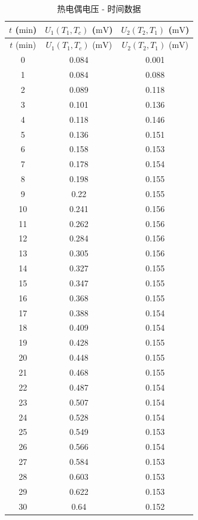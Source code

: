 \documentclass{customDoc}
\begin{document}
\begin{longtable}{|c|c|c|}
    \caption{热电偶电压 - 时间数据} \\
    \hline
    $t$ ($\si{\minute}$) & $U_1(T_1, T_c)$ ($\si{\milli\volt}$) & $U_2 (T_2, T_1)$ ($\si{\milli\volt}$) \\
    \hline
    \endfirsthead
    \hline
    $t$ ($\si{\minute}$) & $U_1(T_1, T_c)$ ($\si{\milli\volt}$) & $U_2 (T_2, T_1)$ ($\si{\milli\volt}$) \\
    \hline
    \endhead
    0     & 0.084 & 0.001 \\
    \hline
    1     & 0.084 & 0.088 \\
    \hline
    2     & 0.089 & 0.118 \\
    \hline
    3     & 0.101 & 0.136 \\
    \hline
    4     & 0.118 & 0.146 \\
    \hline
    5     & 0.136 & 0.151 \\
    \hline
    6     & 0.158 & 0.153 \\
    \hline
    7     & 0.178 & 0.154 \\
    \hline
    8     & 0.198 & 0.155 \\
    \hline
    9     & 0.22  & 0.155 \\
    \hline
    10    & 0.241 & 0.156 \\
    \hline
    11    & 0.262 & 0.156 \\
    \hline
    12    & 0.284 & 0.156 \\
    \hline
    13    & 0.305 & 0.156 \\
    \hline
    14    & 0.327 & 0.155 \\
    \hline
    15    & 0.347 & 0.155 \\
    \hline
    16    & 0.368 & 0.155 \\
    \hline
    17    & 0.388 & 0.154 \\
    \hline
    18    & 0.409 & 0.154 \\
    \hline
    19    & 0.428 & 0.155 \\
    \hline
    20    & 0.448 & 0.155 \\
    \hline
    21    & 0.468 & 0.155 \\
    \hline
    22    & 0.487 & 0.154 \\
    \hline
    23    & 0.507 & 0.154 \\
    \hline
    24    & 0.528 & 0.154 \\
    \hline
    25    & 0.549 & 0.153 \\
    \hline
    26    & 0.566 & 0.154 \\
    \hline
    27    & 0.584 & 0.153 \\
    \hline
    28    & 0.603 & 0.153 \\
    \hline
    29    & 0.622 & 0.153 \\
    \hline
    30    & 0.64  & 0.152 \\
    \hline
\end{longtable}\label{tab:2}
\end{document}

